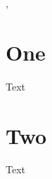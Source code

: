 \documentclass{article}
\begin{document}
  {}
  {\etocname, }%
  {}
  {}%


\tableofcontents

\section{One}

Text

\section{Two}

Text
\end{document}
